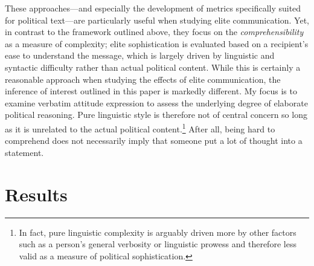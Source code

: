 These approaches---and especially the development of metrics specifically suited for political text---are particularly useful when studying elite communication. Yet, in contrast to the framework outlined above, they focus on the \textit{comprehensibility} as a measure of complexity; elite sophistication is evaluated based on a recipient's ease to understand the message, which is largely driven by linguistic and syntactic difficulty rather than actual political content. While this is certainly a reasonable approach when studying the effects of elite communication, the inference of interest outlined in this paper is markedly different. My focus is to examine verbatim attitude expression to assess the underlying degree of elaborate political reasoning. Pure linguistic style is therefore not of central concern so long as it is unrelated to the actual political content.\footnote{In fact, pure linguistic complexity is arguably driven more by other factors such as a person's general verbosity or linguistic prowess and therefore less valid as a measure of political sophistication.} After all, being hard to comprehend does not necessarily imply that someone put a lot of thought into a statement.



\section*{Results}

